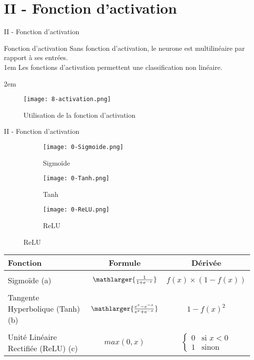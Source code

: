 \section{II - Fonction d'activation}
\begin{frame}{II - Fonction d'activation}
	\begin{block}{Fonction d'activation}
		Sans fonction d'activation, le neurone est multilinéaire par rapport à ses entrées. \\
		\openup 1em
		Les fonctions d'activation permettent une classification non linéaire.
	\end{block}
	\openup 2em
	\begin{figure}
		\centering
		\texttt{[image: 8-activation.png]}
		\caption{Utilisation de la fonction d'activation}
	\end{figure}
\end{frame}


\begin{frame}{II - Fonction d'activation}
	\begin{figure}
		\begin{subfigure}[]{0.3\textwidth}
			\texttt{[image: 0-Sigmoide.png]}
			\caption{Sigmoïde}
		\end{subfigure}
		\begin{subfigure}[]{0.3\textwidth}
			\texttt{[image: 0-Tanh.png]}
			\caption{Tanh}
		\end{subfigure}
		\begin{subfigure}[]{0.3\textwidth}
			\texttt{[image: 0-ReLU.png]}
			\caption{ReLU}
		\end{subfigure}
	\end{figure}
	\begin{block}{}
		\centering
		\begin{tabular}{ l || c | c | }
			Fonction                            & Formule                                          & Dérivée                                    \\ \hline \\
			Sigmoïde (a)                        & $\mathlarger{\frac{1}{1+e^{-x}}}$                & $f(x) \times (1-f(x))$                     \\ \\
			Tangente Hyperbolique (Tanh) (b)    & $\mathlarger{\frac{e^{x}-e^{-x}}{e^{x}+e^{-x}}}$ & $1-f(x)^2$                                 \\ \\
			Unité Linéaire Rectifiée (ReLU) (c) & $max(0, x)$                                      & $ \left\{\begin{array}{ll}
					0 & \mbox{si } x<0 \\
					1 & \mbox{sinon }\end{array}\right.$ \\
		\end{tabular}
	\end{block}
\end{frame}


